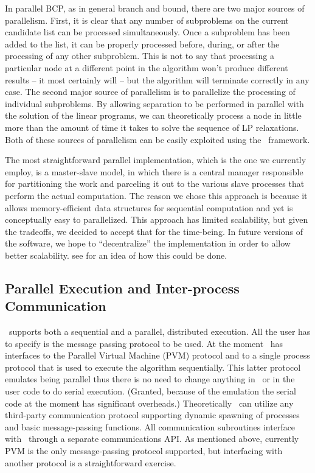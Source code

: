 In parallel BCP, as in general branch and bound, there are two major
sources of parallelism. First, it is clear that any number of
subproblems on the current candidate list can be processed
simultaneously. Once a subproblem has been added to the list, it can
be properly processed before, during, or after the processing of any
other subproblem. This is not to say that processing a particular node
at a different point in the algorithm won't produce different
results -- it most certainly will -- but the algorithm will terminate
correctly in any case. The second major source of parallelism is to
parallelize the processing of individual subproblems. By allowing
separation to be performed in parallel with the solution of the linear
programs, we can theoretically process a node in little more than the
amount of time it takes to solve the sequence of LP relaxations. Both
of these sources of parallelism can be easily exploited using the
\BB\ framework.

The most straightforward parallel implementation, which is the one we
currently employ, is a master-slave model, in which there is a central
manager responsible for partitioning the work and parceling it out to
the various slave processes that perform the actual computation. The
reason we chose this approach is because it allows memory-efficient
data structures for sequential computation and yet is conceptually
easy to parallelized. This approach has limited scalability, but given
the tradeoffs, we decided to accept that for the time-being. In future
versions of the software, we hope to ``decentralize'' the
implementation in order to allow better scalability. see \cite{W:pico}
for an idea of how this could be done.

\subsection{Parallel Execution and Inter-process Communication}

\BB\ supports both a sequential and a parallel, distributed execution. All the
user has to specify is the message passing protocol to be used. At the moment
\BB\ has interfaces to the Parallel Virtual Machine (PVM) \cite{W:pvm} protocol
and to a single process protocol that is used to execute the algorithm
sequentially. This latter protocol emulates being parallel thus there is no
need to change anything in \BB\ or in the user code to do serial execution.
(Granted, because of the emulation the serial code at the moment has
significant overheads.) Theoretically \BB\ can utilize any third-party
communication protocol supporting dynamic spawning of processes and basic
message-passing functions. All communication subroutines interface with
\BB\ through a separate communications API. As mentioned above, currently
PVM is the only message-passing protocol supported, but interfacing with
another protocol is a straightforward exercise.


